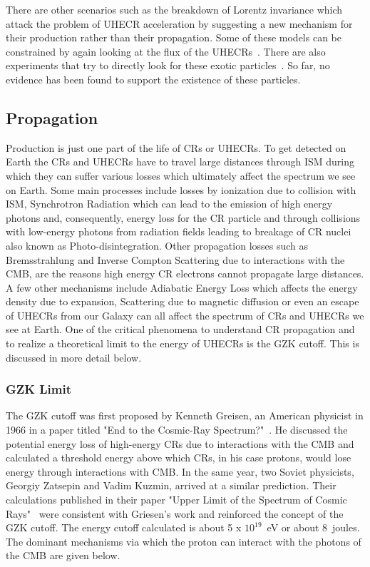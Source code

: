 There are other scenarios such as the breakdown of Lorentz invariance which attack the problem of \gls{UHECR} acceleration by suggesting a new mechanism for their production rather than their propagation. Some of these models can be constrained by again looking at the flux of the \glspl{UHECR}~\cite{PierreAuger:2021tog}. There are also experiments that try to directly look for these exotic particles~\cite{XENON:2023cxc,LZ:2022lsv}. So far, no evidence has been found to support the existence of these particles. 

\subsection{Propagation}
\label{subsec:crprop}
Production is just one part of the life of \glspl{CR} or \glspl{UHECR}. To get detected on Earth the \glspl{CR} and \glspl{UHECR} have to travel large distances through ISM during which they can suffer various losses which ultimately affect the spectrum we see on Earth. Some main processes include losses by ionization due to collision with ISM, Synchrotron Radiation which can lead to the emission of high energy photons and, consequently, energy loss for the \gls{CR} particle and through collisions with low-energy photons from radiation fields leading to breakage of CR nuclei also known as Photo-disintegration. Other propagation losses such as Bremsstrahlung and Inverse Compton Scattering due to interactions with the \gls{CMB}, are the reasons high energy \gls{CR} electrons cannot propagate large distances. A few other mechanisms include Adiabatic Energy Loss which affects the energy density due to expansion, Scattering due to magnetic diffusion or even an escape of \glspl{UHECR} from our Galaxy can all affect the spectrum of \glspl{CR} and \glspl{UHECR} we see at Earth. One of the critical phenomena to understand \gls{CR} propagation and to realize a theoretical limit to the energy of \glspl{UHECR} is the \gls{GZK} cutoff. This is discussed in more detail below.

\subsubsection{GZK Limit}
\label{subsubsec:GZK} 
The \gls{GZK} cutoff was first proposed by Kenneth Greisen, an American physicist in 1966 in a paper titled "End to the Cosmic-Ray Spectrum?"~\cite{PhysRevLett.16.748}. He discussed the potential energy loss of high-energy \glspl{CR} due to interactions with the CMB and calculated a threshold energy above which \glspl{CR}, in his case protons, would lose energy through interactions with \gls{CMB}. In the same year, two Soviet physicists, Georgiy Zatsepin and Vadim Kuzmin, arrived at a similar prediction. Their calculations published in their paper "Upper Limit of the Spectrum of Cosmic Rays"~\cite{Zatsepin:1966jv} were consistent with Griesen's work and reinforced the concept of the \gls*{GZK} cutoff.  
The energy cutoff calculated is about 5 x $10^{19}$~\gls{eV} or about 8~joules. The dominant mechanisms via which the proton can interact with the photons of the \gls*{CMB} are given below. 

